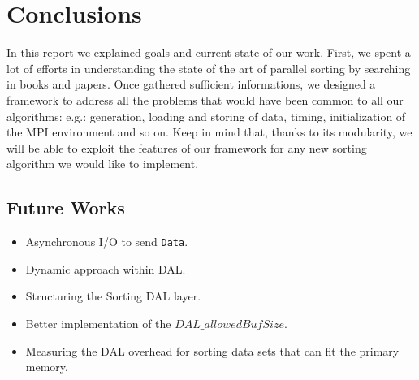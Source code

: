 \label{conclusion}
\section{Conclusions}
In this report we explained goals and current state of our work. First, we spent a lot of efforts in understanding the state of the art of parallel sorting by searching in books and papers. Once gathered sufficient informations, we designed a framework to address all the problems that would have been common to all our algorithms: e.g.: generation, loading and storing of data, timing, initialization of the MPI environment and so on. Keep in mind that, thanks to its modularity, we will be able to exploit the features of our framework for any new sorting algorithm we would like to implement. 

\subsection{Future Works}
\begin{itemize}
\item Asynchronous I/O to send \texttt{Data}. 
\item Dynamic approach within DAL.
\item Structuring the Sorting DAL layer.
\item Better implementation of the $DAL\_allowedBufSize$.
\item Measuring the DAL overhead for sorting data sets that can fit the primary memory.
\end{itemize}